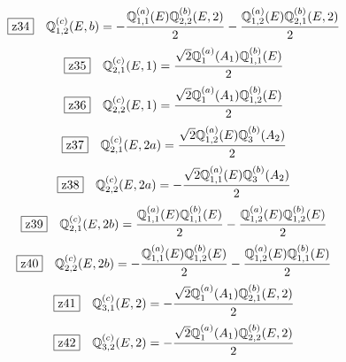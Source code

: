 \documentclass[fleqn,10pt,landscape]{jsarticle}
\begin{document}
\begin{dmath*}
\hspace*{3mm}\fbox{z34}\quad \mathbb{Q}_{1,2}^{(c)}(E,b)=- \frac{\mathbb{Q}_{1,1}^{(a)}(E) \mathbb{Q}_{2,2}^{(b)}(E,2)}{2} - \frac{\mathbb{Q}_{1,2}^{(a)}(E) \mathbb{Q}_{2,1}^{(b)}(E,2)}{2}
\end{dmath*}
\begin{dmath*}
\hspace*{3mm}\fbox{z35}\quad \mathbb{Q}_{2,1}^{(c)}(E,1)=\frac{\sqrt{2} \mathbb{Q}_{1}^{(a)}(A_{1}) \mathbb{Q}_{1,1}^{(b)}(E)}{2}
\end{dmath*}
\begin{dmath*}
\hspace*{3mm}\fbox{z36}\quad \mathbb{Q}_{2,2}^{(c)}(E,1)=\frac{\sqrt{2} \mathbb{Q}_{1}^{(a)}(A_{1}) \mathbb{Q}_{1,2}^{(b)}(E)}{2}
\end{dmath*}
\begin{dmath*}
\hspace*{3mm}\fbox{z37}\quad \mathbb{Q}_{2,1}^{(c)}(E,2a)=\frac{\sqrt{2} \mathbb{Q}_{1,2}^{(a)}(E) \mathbb{Q}_{3}^{(b)}(A_{2})}{2}
\end{dmath*}
\begin{dmath*}
\hspace*{3mm}\fbox{z38}\quad \mathbb{Q}_{2,2}^{(c)}(E,2a)=- \frac{\sqrt{2} \mathbb{Q}_{1,1}^{(a)}(E) \mathbb{Q}_{3}^{(b)}(A_{2})}{2}
\end{dmath*}
\begin{dmath*}
\hspace*{3mm}\fbox{z39}\quad \mathbb{Q}_{2,1}^{(c)}(E,2b)=\frac{\mathbb{Q}_{1,1}^{(a)}(E) \mathbb{Q}_{1,1}^{(b)}(E)}{2} - \frac{\mathbb{Q}_{1,2}^{(a)}(E) \mathbb{Q}_{1,2}^{(b)}(E)}{2}
\end{dmath*}
\begin{dmath*}
\hspace*{3mm}\fbox{z40}\quad \mathbb{Q}_{2,2}^{(c)}(E,2b)=- \frac{\mathbb{Q}_{1,1}^{(a)}(E) \mathbb{Q}_{1,2}^{(b)}(E)}{2} - \frac{\mathbb{Q}_{1,2}^{(a)}(E) \mathbb{Q}_{1,1}^{(b)}(E)}{2}
\end{dmath*}
\begin{dmath*}
\hspace*{3mm}\fbox{z41}\quad \mathbb{Q}_{3,1}^{(c)}(E,2)=- \frac{\sqrt{2} \mathbb{Q}_{1}^{(a)}(A_{1}) \mathbb{Q}_{2,1}^{(b)}(E,2)}{2}
\end{dmath*}
\begin{dmath*}
\hspace*{3mm}\fbox{z42}\quad \mathbb{Q}_{3,2}^{(c)}(E,2)=- \frac{\sqrt{2} \mathbb{Q}_{1}^{(a)}(A_{1}) \mathbb{Q}_{2,2}^{(b)}(E,2)}{2}
\end{dmath*}
\vspace{5mm}
\end{document}

